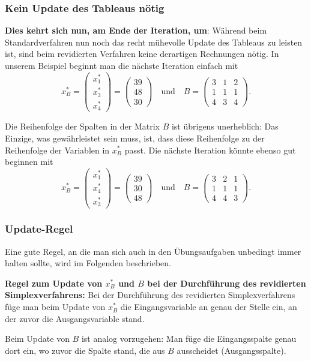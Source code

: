 \documentclass[smaller]{beamer}
\begin{document}
\begin{frame}
 \frametitle{Kein Update des Tableaus nötig}
 \textbf{Dies kehrt sich nun, am Ende der Iteration, um}: Während beim Standardverfahren nun noch das recht mühevolle Update des Tableaus zu leisten ist, \alert{sind beim revidierten Verfahren keine derartigen Rechnungen nötig}. In unserem Beispiel beginnt man die nächste Iteration einfach mit
\[
x_B^* = \begin{pmatrix} x_1^* \\ x_3^* \\ x_4^* \end{pmatrix} = \begin{pmatrix} 39 \\ 48 \\ 30 \end{pmatrix} \quad \text{und} \quad
B = \begin{pmatrix} 3 & 1 & 2 \\ 1 & 1 & 1 \\ 4 & 3 & 4 \end{pmatrix}.
\]

Die Reihenfolge der Spalten in der Matrix $B$ ist übrigens unerheblich: \alert{Das Einzige, was gewährleistet sein muss, ist, dass diese Reihenfolge zu der Reihenfolge der Variablen in $x_B^*$ passt}. Die nächste Iteration könnte ebenso gut beginnen mit
\[
x_B^* = \begin{pmatrix} x_1^* \\ x_4^* \\ x_3^* \end{pmatrix} = \begin{pmatrix} 39 \\ 30 \\ 48 \end{pmatrix} \quad \text{und} \quad
B = \begin{pmatrix} 3 & 2 & 1 \\ 1 & 1 & 1 \\ 4 & 4 & 3 \end{pmatrix}.
\]
\end{frame}

\begin{frame}
 \frametitle{Update-Regel}
Eine gute \alert{Regel}, an die man sich auch in den Übungsaufgaben unbedingt immer halten sollte, wird im Folgenden beschrieben. \\ \vspace*{0.2cm}

\textbf{Regel zum Update von $x_B^*$ und $B$ bei der Durchführung des revidierten Simplexverfahrens:}
Bei der Durchführung des revidierten Simplexverfahrens füge man beim \alert{Update von $x_B^*$} die Eingangsvariable an genau der Stelle ein, an der zuvor die Ausgangsvariable stand. \\ \vspace*{0.2cm}

Beim \alert{Update von $B$} ist analog vorzugehen: Man füge die Eingangsspalte genau dort ein, wo zuvor die Spalte stand, die aus $B$ ausscheidet (\alert{Ausgangsspalte}).
\end{frame}
\end{document}
